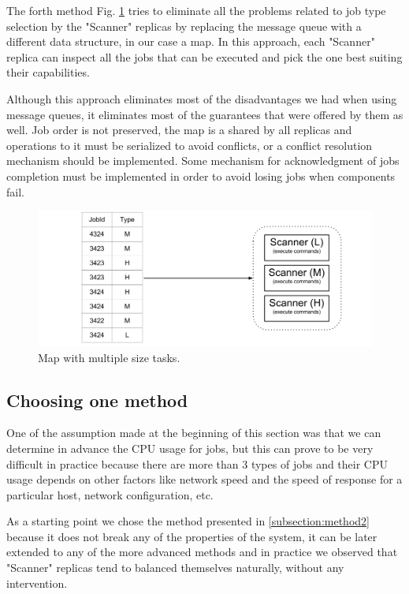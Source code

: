 The forth method Fig. \ref{fig:mapDistributionOfTasks} tries to eliminate all the problems related to job type selection by the "Scanner" replicas by replacing the message queue with a different data structure, in our case a map. In this approach, each "Scanner" replica can inspect all the jobs that can be executed and pick the one best suiting their capabilities.

Although this approach eliminates most of the disadvantages we had when using message queues, it eliminates most of the guarantees that were offered by them as well. Job order is not preserved, the map is a shared by all replicas and operations to it must be serialized to avoid conflicts, or a conflict resolution mechanism should be implemented. Some mechanism for acknowledgment of jobs completion must be implemented in order to avoid losing jobs when components fail.

\begin{figure}[ht]
\centering
\includegraphics[width=\linewidth]{./img/4_MapOrOtherDataStructureLoadBalancing.png}
\caption{Map with multiple size tasks.}
\label{fig:mapDistributionOfTasks}
\end{figure}

\subsection{Choosing one method}
One of the assumption made at the beginning of this section was that we can determine in advance the CPU usage for jobs, but this can prove to be very difficult in practice because there are more than 3 types of jobs and their CPU usage depends on other factors like network speed and the speed of response for a particular host, network configuration, etc.

As a starting point we chose the method presented in \ref{subsection:method2} because it does not break any of the properties of the system, it can be later extended to any of the more advanced methods and in practice we observed that "Scanner" replicas tend to balanced themselves naturally, without any intervention.